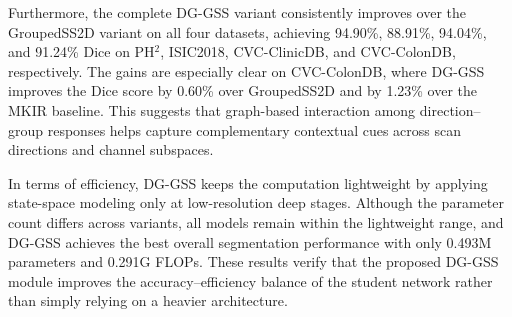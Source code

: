 Furthermore, the complete DG-GSS variant consistently improves over the GroupedSS2D variant on all four datasets, achieving 94.90\%, 88.91\%, 94.04\%, and 91.24\% Dice on PH$^2$, ISIC2018, CVC-ClinicDB, and CVC-ColonDB, respectively. The gains are especially clear on CVC-ColonDB, where DG-GSS improves the Dice score by 0.60\% over GroupedSS2D and by 1.23\% over the MKIR baseline. This suggests that graph-based interaction among direction--group responses helps capture complementary contextual cues across scan directions and channel subspaces.

In terms of efficiency, DG-GSS keeps the computation lightweight by applying state-space modeling only at low-resolution deep stages. Although the parameter count differs across variants, all models remain within the lightweight range, and DG-GSS achieves the best overall segmentation performance with only 0.493M parameters and 0.291G FLOPs. These results verify that the proposed DG-GSS module improves the accuracy--efficiency balance of the student network rather than simply relying on a heavier architecture.